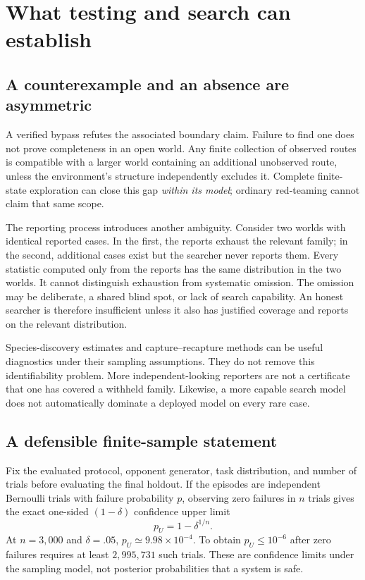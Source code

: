 \section{What testing and search can establish}
\label{sec:search}

\subsection{A counterexample and an absence are asymmetric}
A verified bypass refutes the associated boundary claim. Failure to find one does not prove completeness in an open world. Any finite collection of observed routes is compatible with a larger world containing an additional unobserved route, unless the environment's structure independently excludes it. Complete finite-state exploration can close this gap \emph{within its model}; ordinary red-teaming cannot claim that same scope.

The reporting process introduces another ambiguity. Consider two worlds with identical reported cases. In the first, the reports exhaust the relevant family; in the second, additional cases exist but the searcher never reports them. Every statistic computed only from the reports has the same distribution in the two worlds. It cannot distinguish exhaustion from systematic omission. The omission may be deliberate, a shared blind spot, or lack of search capability. An honest searcher is therefore insufficient unless it also has justified coverage and reports on the relevant distribution.

Species-discovery estimates and capture--recapture methods can be useful diagnostics under their sampling assumptions. They do not remove this identifiability problem. More independent-looking reporters are not a certificate that one has covered a withheld family. Likewise, a more capable search model does not automatically dominate a deployed model on every rare case.

\subsection{A defensible finite-sample statement}
Fix the evaluated protocol, opponent generator, task distribution, and number of trials before evaluating the final holdout. If the episodes are independent Bernoulli trials with failure probability $p$, observing zero failures in $n$ trials gives the exact one-sided $(1-\delta)$ confidence upper limit \cite{clopper}
\begin{equation}
p_U=1-\delta^{1/n}.
\label{eq:binomial}
\end{equation}
At $n=3{,}000$ and $\delta=.05$, $p_U\simeq9.98\times10^{-4}$. To obtain $p_U\le10^{-6}$ after zero failures requires at least $2{,}995{,}731$ such trials. These are confidence limits under the sampling model, not posterior probabilities that a system is safe.

